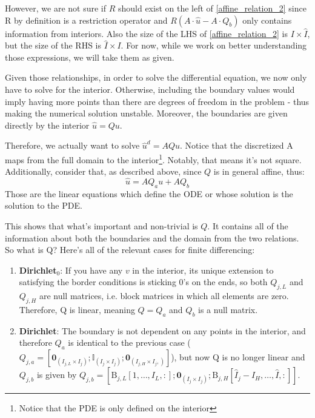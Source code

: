 \documentclass[11pt]{article}
\begin{document}
\begin{itemize}
	However, we are not sure if $R$ should exist on the left of \eqref{affine_relation_2} since R by definition is a restriction operator and $R(A\cdot \hat{u}-A\cdot Q_b)$ only contains information from interiors. Also the size of the LHS of \eqref{affine_relation_2} is $I\times \hat{I}$, but the size of the RHS is $\hat{I}\times I$.
	For now, while we work on better understanding those expressions, we will take them as given.
	
	
	Given those relationships, in order to solve the differential equation, we now only have to solve for the interior. Otherwise, including the boundary values would imply having more points than there are degrees of freedom in the problem - thus making the numerical solution unstable. Moreover, the boundaries are given directly by the interior $\hat{u} = Qu$. 
	
	Therefore, we actually want to solve $\hat{u}^d = AQu$. Notice that the discretized A maps from the full domain to the interior\footnote{Notice that the PDE is only defined on the interior}. Notably, that means it's not square. Additionally, consider that, as described above, since $Q$ is in general affine, thus:
	\begin{equation}
		\hat{u} = AQ_au + AQ_b
	\end{equation}
	Those are the linear equations which define the ODE or whose solution is the solution to the PDE.
	
	This shows that what's important and non-trivial is $Q$. It contains all of the information about both the boundaries and the domain from the two relations. So what is Q? Here's all of the relevant cases for finite differencing:
	\begin{enumerate}
		\item \textbf{Dirichlet$_0$}: If you have any $v$ in the interior, its unique extension to satisfying the border conditions is sticking $0$'s on the ends, so both $Q_{j,L}$ and $Q_{j,H}$ are null matrices, i.e. block matrices in which all elements are zero. Therefore, Q is linear, meaning $Q = Q_a$ and $Q_b$ is a null matrix.
		
		\item \textbf{Dirichlet}: The boundary is not dependent on any points in the interior, and therefore $Q_a$ is identical to the previous case ($Q_{j,a} = [\textbf{0}_{(I_{j,L} \times I_j)}; \mathbb{I}_{(I_j \times I_j)} ; \textbf{0}_{(I_{j,H} \times I_j,)} ]$), but now Q is no longer linear and
		$Q_{j,b}$ is given by 
		$Q_{j,b} = [\text{B}_{j,L}[1,\dots,I_L,:]; \textbf{0}_{(I_j\times I_j)};
		\text{B}_{j,H}[\hat{I}_j - I_H,\dots,\hat{I},:]]$.
		

\end{enumerate}
\end{itemize}
\end{document}
